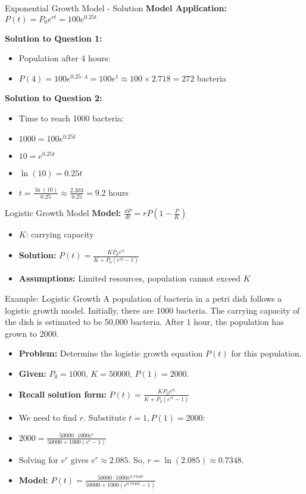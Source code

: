 \documentclass[10pt,aspectratio=169]{beamer}
\begin{document}
\begin{frame}{Exponential Growth Model - Solution}
    \textbf{Model Application:} $P(t) = P_0 e^{rt} = 100e^{0.25t}$
    
    \textbf{Solution to Question 1:}
    \begin{itemize}
        \item Population after 4 hours: 
        \item $P(4) = 100e^{0.25 \cdot 4} = 100e^1 \approx 100 \times 2.718 = 272$ bacteria
    \end{itemize}
    
    \textbf{Solution to Question 2:}
    \begin{itemize}
        \item Time to reach 1000 bacteria:
        \item $1000 = 100e^{0.25t}$
        \item $10 = e^{0.25t}$
        \item $\ln(10) = 0.25t$
        \item $t = \frac{\ln(10)}{0.25} \approx \frac{2.303}{0.25} = 9.2$ hours
    \end{itemize}
\end{frame}

\begin{frame}{Logistic Growth Model}
    \textbf{Model:} $\frac{dP}{dt} = rP\left(1-\frac{P}{K}\right)$
    \begin{itemize}
        \item $K$: carrying capacity
        \item \textbf{Solution:} $P(t) = \frac{KP_0 e^{rt}}{K + P_0 (e^{rt} - 1)}$
        \item \textbf{Assumptions:} Limited resources, population cannot exceed $K$
    \end{itemize}
\end{frame}

\begin{frame}{Example: Logistic Growth}
    A population of bacteria in a petri dish follows a logistic growth model. Initially, there are 1000 bacteria. The carrying capacity of the dish is estimated to be 50,000 bacteria. After 1 hour, the population has grown to 2000.
    \begin{itemize}
        \item \textbf{Problem:} Determine the logistic growth equation $P(t)$ for this population.
        \item \textbf{Given:} $P_0 = 1000$, $K = 50000$, $P(1) = 2000$.
        \item \textbf{Recall solution form:} $P(t) = \frac{KP_0 e^{rt}}{K + P_0 (e^{rt} - 1)}$
        \item We need to find $r$. Substitute $t=1, P(1)=2000$:
        \item $2000 = \frac{50000 \cdot 1000 e^{r}}{50000 + 1000 (e^{r} - 1)}$
        \item Solving for $e^r$ gives $e^r \approx 2.085$. So, $r = \ln(2.085) \approx 0.7348$.
        \item \textbf{Model:} $P(t) = \frac{50000 \cdot 1000 e^{0.7348t}}{50000 + 1000 (e^{0.7348t} - 1)}$
    \end{itemize}
\end{frame}
\end{document}
